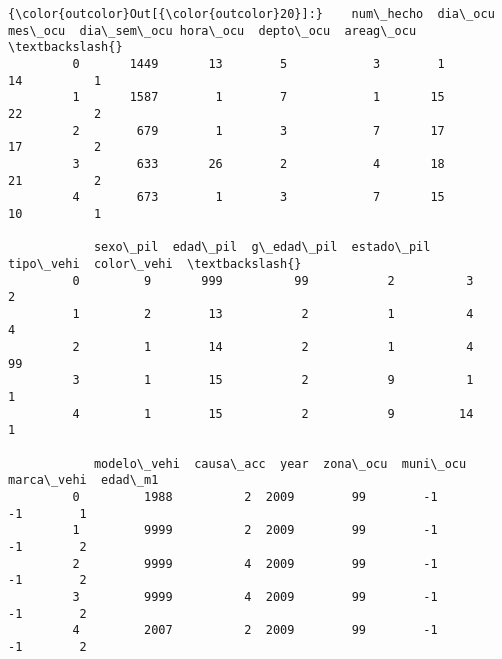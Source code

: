 \documentclass[11pt]{article}
\begin{document}
\begin{Verbatim}[commandchars=\\\{\}]
{\color{outcolor}Out[{\color{outcolor}20}]:}    num\_hecho  dia\_ocu  mes\_ocu  dia\_sem\_ocu hora\_ocu  depto\_ocu  areag\_ocu  \textbackslash{}
         0       1449       13        5            3        1         14          1   
         1       1587        1        7            1       15         22          2   
         2        679        1        3            7       17         17          2   
         3        633       26        2            4       18         21          2   
         4        673        1        3            7       15         10          1   
         
            sexo\_pil  edad\_pil  g\_edad\_pil  estado\_pil  tipo\_vehi  color\_vehi  \textbackslash{}
         0         9       999          99           2          3           2   
         1         2        13           2           1          4           4   
         2         1        14           2           1          4          99   
         3         1        15           2           9          1           1   
         4         1        15           2           9         14           1   
         
            modelo\_vehi  causa\_acc  year  zona\_ocu  muni\_ocu  marca\_vehi  edad\_m1  
         0         1988          2  2009        99        -1          -1        1  
         1         9999          2  2009        99        -1          -1        2  
         2         9999          4  2009        99        -1          -1        2  
         3         9999          4  2009        99        -1          -1        2  
         4         2007          2  2009        99        -1          -1        2  
\end{Verbatim}
            
\end{document}

